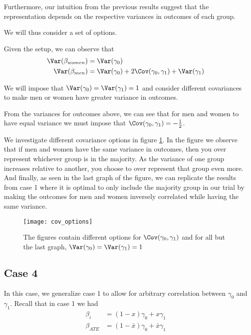 Furthermore, our intuition from the previous results suggest that the representation depends on the respective variances in outcomes of each group.

We will thus consider a set of options.

Given the setup, we can observe that
\begin{align*}
	\Var(\beta_{women}) &= \Var(\gamma_0) \\
	\Var(\beta_{men}) &= \Var(\gamma_0) + 2\Cov(\gamma_0, \gamma_1) + \Var(\gamma_1) \\
\end{align*} 

We will impose that $\Var(\gamma_0) = \Var(\gamma_1) = 1$ and consider different covariances to make men or women have greater variance in outcomes.

From the variances for outcomes above, we can see that for men and women to have equal variance we must impose that $\Cov(\gamma_0, \gamma_1) = -\frac{1}{2}$.

We investigate different covariance options in figure \ref{fig:cov_options}. In the figure we observe that if men and women have the same variance in outcomes, then you over represent whichever group is in the majority. As the variance of one group increases relative to another, you choose to over represent that group even more.
And finally, as seen in the last graph of the figure, we can replicate the results from case 1 where it is optimal to only include the majority group in our trial by making the outcomes for men and women inversely correlated while having the same variance.

\begin{figure}[btp]
	\centering
	\texttt{[image: cov\_options]}
	\caption{The figures contain different options for $\Cov(\gamma_0, \gamma_1)$ and for all but the last graph, $\Var(\gamma_0) = \Var(\gamma_1) = 1$} 
	\label{fig:cov_options}
\end{figure}

\subsection*{Case 4}

In this case, we generalize case 1 to allow for arbitrary correlation between $\gamma_0$ and $\gamma_1$.
Recall that in case 1 we had
\begin{align*}
	\beta_i &=  (1-x)\gamma_0 + x \gamma_1 \\
	\beta_{ATE} &=  (1 - \bar{x})\gamma_0 + \bar{x} \gamma_1 \\
\end{align*}


